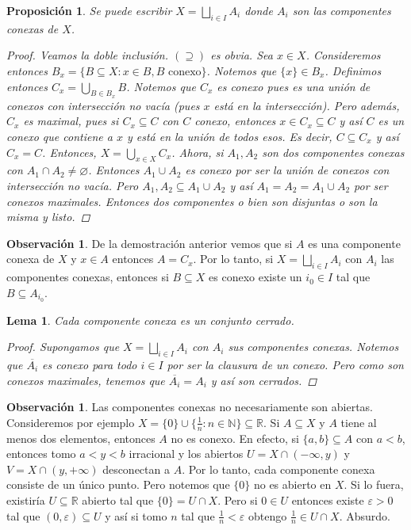 \documentclass[12pt]{book}
\newtheorem{lem}[teo]{Lema}
\newtheorem{prop}[teo]{Proposición}
\theoremstyle{definition}
\newtheorem{obs}[teo]{Observación}
\newcommand{\RR}{\mathbb{R}}      %
\newcommand{\NN}{\mathbb{N}}
\let\emptyset\varnothing
\begin{document}
\begin{prop}
Se puede escribir $X=\bigsqcup_{i\in I} A_i$ donde $A_i$ son las componentes conexas de $X$.
\begin{proof}

Veamos la doble inclusión. $(\supseteq)$ es obvia. Sea $x\in X$. Consideremos entonces $B_x = \{B\subseteq X : x\in B, B\text{ conexo}\}$. Notemos que $\{x\}\in B_x$. Definimos entonces $C_x = \displaystyle\bigcup_{B\in B_x}B$. Notemos que $C_x$ es conexo pues es una unión de conexos con intersección no vacía (pues $x$ está en la intersección). Pero además, $C_x$ es maximal, pues si $C_x \subseteq C$ con $C$ conexo, entonces $x\in C_x\subseteq C$ y así $C$ es un conexo que contiene a $x$ y está en la unión de todos esos. Es decir, $C\subseteq C_x$ y así $C_x=C$. Entonces, $X=\displaystyle\bigcup_{x\in X}C_x$. Ahora, si $A_1,A_2$ son dos componentes conexas con $A_1\cap A_2\neq\emptyset$. Entonces $A_1\cup A_2$ es conexo por ser la unión de conexos con intersección no vacía. Pero $A_1,A_2\subseteq A_1\cup A_2$ y así $A_1=A_2=A_1\cup A_2$ por ser conexos maximales. Entonces dos componentes o bien son disjuntas o son la misma y listo.

\end{proof}
\end{prop}

\begin{obs}
De la demostración anterior vemos que si $A$ es una componente conexa de $X$ y $x\in A$ entonces $A=C_x$. Por lo tanto, si $X=\bigsqcup_{i\in I}A_i$ con $A_i$ las componentes conexas, entonces si $B\subseteq X$ es conexo existe un $i_0\in I$ tal que $B\subseteq A_{i_0}$.
\end{obs}

\begin{lem}
Cada componente conexa es un conjunto cerrado.
\begin{proof}
Supongamos que $X=\bigsqcup_{i\in I}A_i$ con $A_i$ sus componentes conexas. Notemos que $\overline{A_i}$ es conexo para todo $i\in I$ por ser la clausura de un conexo. Pero como son conexos maximales, tenemos que $\overline{A_i}=A_i$ y así son cerrados.
\end{proof}
\end{lem}

\begin{obs}
Las componentes conexas no necesariamente son abiertas. Consideremos por ejemplo $X=\{0\}\cup \{\frac{1}{n}:n\in\NN\}\subseteq \RR$. Si $A\subseteq X$ y $A$ tiene al menos dos elementos, entonces $A$ no es conexo. En efecto, si $\{a,b\}\subseteq A$ con $a<b$, entonces tomo $a<y<b$ irracional y los abiertos $U=X\cap (-\infty,y)$ y $V=X\cap (y,+\infty)$ desconectan a $A$. Por lo tanto, cada componente conexa consiste de un único punto. Pero notemos que $\{0\}$ no es abierto en $X$. Si lo fuera, existiría $U\subseteq\RR$ abierto tal que $\{0\}=U\cap X$. Pero si $0\in U$ entonces existe $\varepsilon>0$ tal que $(0,\varepsilon)\subseteq U$ y así si tomo $n$ tal que $\frac{1}{n}<\varepsilon$ obtengo $\frac{1}{n}\in U\cap X$. Absurdo.
\end{obs}
\end{document}
